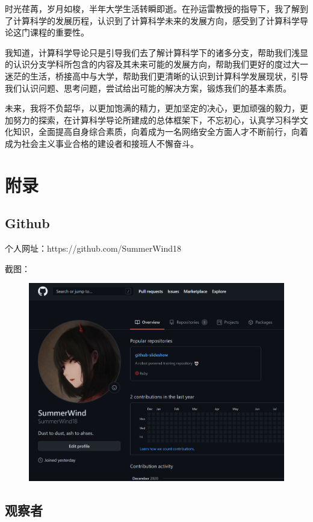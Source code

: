 \documentclass{article}
\begin{document}
时光荏苒，岁月如梭，半年大学生活转瞬即逝。在孙运雷教授的指导下，我了解到了计算科学的发展历程，认识到了计算科学未来的发展方向，感受到了计算科学导论这门课程的重要性。

我知道，计算科学导论只是引导我们去了解计算科学下的诸多分支，帮助我们浅显的认识分支学科所包含的内容及其未来可能的发展方向，帮助我们更好的度过大一迷茫的生活，桥接高中与大学，帮助我们更清晰的认识到计算科学发展现状，引导我们认识问题、思考问题，尝试给出可能的解决方案，锻炼我们的基本素质。

未来，我将不负韶华，以更加饱满的精力，更加坚定的决心，更加顽强的毅力，更加努力的探索，在计算科学导论所建成的总体框架下，不忘初心，认真学习科学文化知识，全面提高自身综合素质，向着成为一名网络安全方面人才不断前行，向着成为社会主义事业合格的建设者和接班人不懈奋斗。

\section{附录}

\subsection{Github}

个人网址：https://github.com/SummerWind18

截图：
\begin{figure}[H]
    \centering
    \includegraphics[scale=0.3]{Github}
    \label{fig:Github}
\end{figure}

\subsection{观察者}
\end{document}

